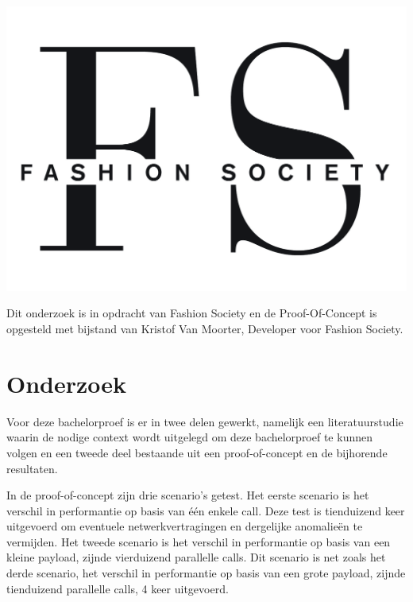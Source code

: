 \documentclass[a0,portrait]{a0poster}
\begin{document}
\begin{multicols}{2}
\begin{center}\vspace{1cm}
	\includegraphics[width=1.0\linewidth]{Fashion_society}
\end{center}\vspace{1cm}

Dit onderzoek is in opdracht van Fashion Society en de Proof-Of-Concept is opgesteld met bijstand van Kristof Van Moorter, Developer voor Fashion Society.

\color{Black} %
\color{HoGentAccent1} 
\section*{Onderzoek}
\color{black}
Voor deze bachelorproef is er in twee delen gewerkt, namelijk een literatuurstudie waarin de nodige context wordt uitgelegd om deze bachelorproef te kunnen volgen en een tweede deel bestaande uit een proof-of-concept en de bijhorende resultaten.

In de proof-of-concept zijn drie scenario's getest. Het eerste scenario is het verschil in performantie op basis van één enkele call. Deze test is tienduizend keer uitgevoerd om eventuele netwerkvertragingen en dergelijke anomalieën te vermijden.
Het tweede scenario is het verschil in performantie op basis van een kleine payload, zijnde vierduizend parallelle calls. Dit scenario is net zoals het derde scenario, het verschil in performantie op basis van een grote payload, zijnde tienduizend parallelle calls, 4 keer uitgevoerd. 


\end{multicols}
\end{document}

